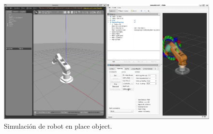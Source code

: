\begin{figure} [H]
	\centering
	\includegraphics[width=0.9\linewidth]{img/SIMU11}
	\caption{Simulación de robot en place object.}
	\label{fig:SIMU11}
\end{figure}






